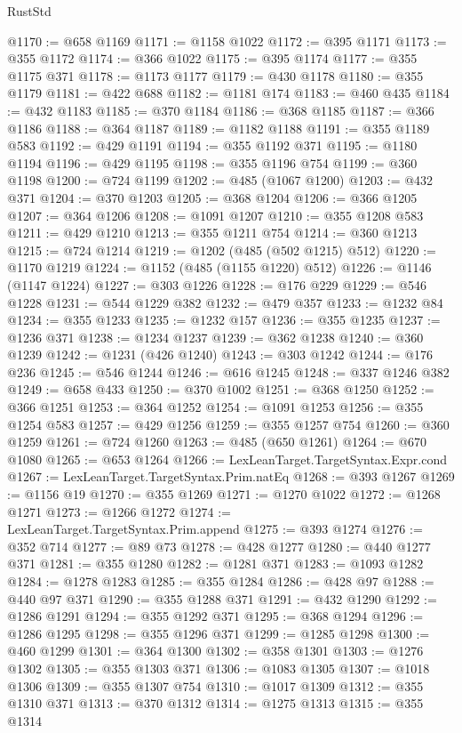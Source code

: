 \begin{lexlean}{RustStd}
\begin{coremodule}
@1170 := @658 @1169
@1171 := @1158 @1022
@1172 := @395 @1171
@1173 := @355 @1172
@1174 := @366 @1022
@1175 := @395 @1174
@1177 := @355 @1175 @371
@1178 := @1173 @1177
@1179 := @430 @1178
@1180 := @355 @1179
@1181 := @422 @688
@1182 := @1181 @174
@1183 := @460 @435
@1184 := @432 @1183
@1185 := @370 @1184
@1186 := @368 @1185
@1187 := @366 @1186
@1188 := @364 @1187
@1189 := @1182 @1188
@1191 := @355 @1189 @583
@1192 := @429 @1191
@1194 := @355 @1192 @371
@1195 := @1180 @1194
@1196 := @429 @1195
@1198 := @355 @1196 @754
@1199 := @360 @1198
@1200 := @724 @1199
@1202 := @485 (@1067 @1200)
@1203 := @432 @371
@1204 := @370 @1203
@1205 := @368 @1204
@1206 := @366 @1205
@1207 := @364 @1206
@1208 := @1091 @1207
@1210 := @355 @1208 @583
@1211 := @429 @1210
@1213 := @355 @1211 @754
@1214 := @360 @1213
@1215 := @724 @1214
@1219 := @1202 (@485 (@502 @1215) @512)
@1220 := @1170 @1219
@1224 := @1152 (@485 (@1155 @1220) @512)
@1226 := @1146 (@1147 @1224)
@1227 := @303 @1226
@1228 := @176 @229
@1229 := @546 @1228
@1231 := @544 @1229 @382
@1232 := @479 @357
@1233 := @1232 @84
@1234 := @355 @1233
@1235 := @1232 @157
@1236 := @355 @1235
@1237 := @1236 @371
@1238 := @1234 @1237
@1239 := @362 @1238
@1240 := @360 @1239
@1242 := @1231 (@426 @1240)
@1243 := @303 @1242
@1244 := @176 @236
@1245 := @546 @1244
@1246 := @616 @1245
@1248 := @337 @1246 @382
@1249 := @658 @433
@1250 := @370 @1002
@1251 := @368 @1250
@1252 := @366 @1251
@1253 := @364 @1252
@1254 := @1091 @1253
@1256 := @355 @1254 @583
@1257 := @429 @1256
@1259 := @355 @1257 @754
@1260 := @360 @1259
@1261 := @724 @1260
@1263 := @485 (@650 @1261)
@1264 := @670 @1080
@1265 := @653 @1264
@1266 := LexLeanTarget.TargetSyntax.Expr.cond
@1267 := LexLeanTarget.TargetSyntax.Prim.natEq
@1268 := @393 @1267
@1269 := @1156 @19
@1270 := @355 @1269
@1271 := @1270 @1022
@1272 := @1268 @1271
@1273 := @1266 @1272
@1274 := LexLeanTarget.TargetSyntax.Prim.append
@1275 := @393 @1274
@1276 := @352 @714
@1277 := @89 @73
@1278 := @428 @1277
@1280 := @440 @1277 @371
@1281 := @355 @1280
@1282 := @1281 @371
@1283 := @1093 @1282
@1284 := @1278 @1283
@1285 := @355 @1284
@1286 := @428 @97
@1288 := @440 @97 @371
@1290 := @355 @1288 @371
@1291 := @432 @1290
@1292 := @1286 @1291
@1294 := @355 @1292 @371
@1295 := @368 @1294
@1296 := @1286 @1295
@1298 := @355 @1296 @371
@1299 := @1285 @1298
@1300 := @460 @1299
@1301 := @364 @1300
@1302 := @358 @1301
@1303 := @1276 @1302
@1305 := @355 @1303 @371
@1306 := @1083 @1305
@1307 := @1018 @1306
@1309 := @355 @1307 @754
@1310 := @1017 @1309
@1312 := @355 @1310 @371
@1313 := @370 @1312
@1314 := @1275 @1313
@1315 := @355 @1314

\end{coremodule}
\end{lexlean}
